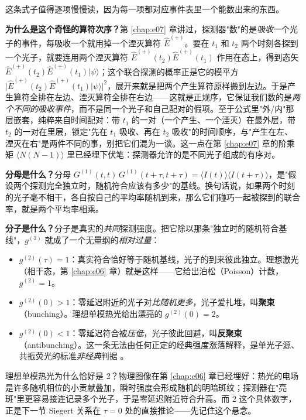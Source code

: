 这条式子值得逐项慢慢读，因为每一项都对应事件表里一个能数出来的东西。

\textbf{为什么是这个奇怪的算符次序？}第 \ref{chap:e07} 章讲过，探测器"数"的是\emph{吸收}一个光子的事件，每吸收一个就用掉一个湮灭算符 \(\hat E^{(+)}\)。要在 \(t_1\) 和 \(t_2\) 两个时刻各探到一个光子，就要连用两个湮灭算符 \(\hat E^{(+)}(t_2)\hat E^{(+)}(t_1)\) 作用在态上，得到态矢 \(\hat E^{(+)}(t_2)\hat E^{(+)}(t_1)|\psi\rangle\)；这个联合探测的概率正是它的模平方 \(\big|\hat E^{(+)}(t_2)\hat E^{(+)}(t_1)|\psi\rangle\big|^2\)，展开来就是把两个产生算符原样搬到左边。于是产生算符全排在左边、湮灭算符全排在右边——这就是正规序，它保证我们数的是\emph{两个不同的吸收事件}，而不是同一个光子和自己配对的假项。至于公式里"外/内"那层嵌套，纯粹来自时间配对：带 \(t_1\) 的一对（一个产生、一个湮灭）在最外层，带 \(t_2\) 的一对在里层，锁定"先在 \(t_1\) 吸收、再在 \(t_2\) 吸收"的时间顺序，与"产生在左、湮灭在右"是两件不同的事，别把它们混为一谈。这一点在第 \ref{chap:e07} 章的阶乘矩 \(\langle N(N-1)\rangle\) 里已经埋下伏笔：探测器允许的是不同光子组成的有序对。

\textbf{分母是什么？}分母 \(G^{(1)}(t,t)\,G^{(1)}(t+\tau,t+\tau)=\langle I(t)\rangle\langle I(t+\tau)\rangle\)，是"假设两个探测完全独立时，随机符合应该有多少"的基线。换句话说，如果两个时刻的光子毫不相干，各自按自己的平均率随机到来，那么它们碰巧一起被探到的联合率，就是两个平均率相乘。

\textbf{分子是什么？}分子是真实的\emph{共同}探测强度。把它除以那条"独立时的随机符合基线"，\(g^{(2)}\) 就成了一个无量纲的\emph{相对过量}：

\begin{itemize}
  \item \(g^{(2)}(\tau)=1\)：真实符合恰好等于随机基线，光子的到来彼此独立。理想激光（相干态，第 \ref{chap:e06} 章）就是这样——它给出泊松（Poisson）计数，\(g^{(2)}=1\)。
  \item \(g^{(2)}(0)>1\)：零延迟附近的光子对\emph{比随机更多}，光子爱扎堆，叫\textbf{聚束}（bunching）。理想单模热光给出漂亮的 \(g^{(2)}(0)=2\)。
  \item \(g^{(2)}(0)<1\)：零延迟符合被\emph{压低}，光子彼此回避，叫\textbf{反聚束}（antibunching）。这一条无法由任何正定的经典强度涨落解释，是单光子源、共振荧光的标准\emph{非经典}判据 \citep{1977PhRvL..39..691K}。
\end{itemize}

理想单模热光为什么恰好是 2？物理图像在第 \ref{chap:e06} 章已经埋好：热光的电场是许多随机相位的小贡献叠加，瞬时强度会形成随机的明暗斑纹；探测器在"亮斑"里更容易接连记录多个光子，于是零延迟附近符合升高。而 2 这个具体数字，正是下一节 Siegert 关系在 \(\tau=0\) 处的直接推论——先记住这个悬念。


